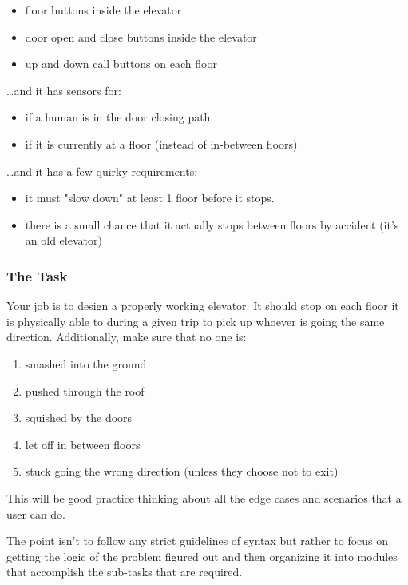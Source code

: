 \documentclass[11pt]{article}
\begin{document}
\begin{itemize}
\item floor buttons inside the elevator
\item door open and close buttons inside the elevator
\item up and down call buttons on each floor
\end{itemize}


\ldots{}and it has sensors for:

\begin{itemize}
\item if a human is in the door closing path
\item if it is currently at a floor (instead of in-between floors)
\end{itemize}


\ldots{}and it has a few quirky requirements:

\begin{itemize}
\item it must "slow down" at least 1 floor before it stops.
\item there is a small chance that it actually stops between floors by 
accident (it's an old elevator)
\end{itemize}

\subsubsection{The Task}
\label{sec-2-1-2}

Your job is to design a properly working elevator. It should stop on each 
floor it is physically able to during a given trip to pick up whoever is 
going the same direction. Additionally, make sure that no one is:

\begin{enumerate}
\item smashed into the ground
\item pushed through the roof
\item squished by the doors
\item let off in between floors
\item stuck going the wrong direction (unless they choose not to exit)
\end{enumerate}


This will be good practice thinking about all the edge cases and scenarios 
that a user can do.

The point isn't to follow any strict guidelines of syntax but rather to 
focus on getting the logic of the problem figured out and then organizing it
into modules that accomplish the sub-tasks that are required.
\end{document}
